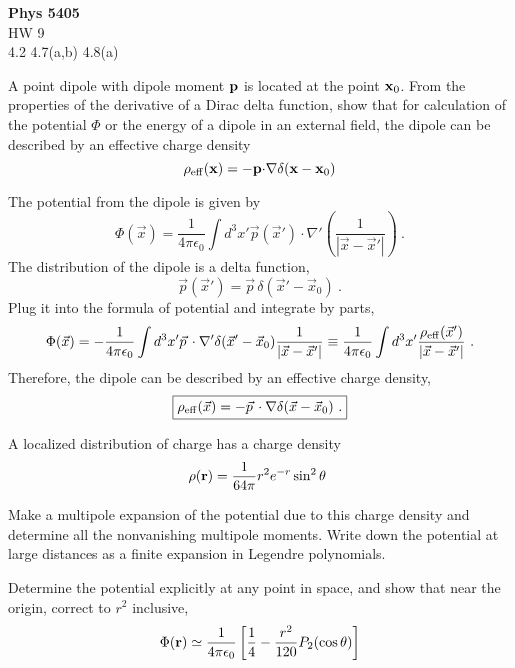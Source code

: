 \documentclass[12pt]{article}
\newcommand{\x}{{\bf x}}
\newcommand{\p}{{\bf p}}
\begin{document}
\begin{center}
{\bf Phys 5405}\\
HW 9 \\
4.2 4.7(a,b) 4.8(a)
\end{center}
 A point dipole with dipole moment $\bf p$ is located at the point ${\bf x}_0$. From the properties of the derivative of a Dirac delta function, show that for calculation of the potential $\Phi$ or the energy of a dipole in an external field, the dipole can be described by an effective charge density
$$
\rho_{\rm eff}(\x) = - \p {\bf \cdot \nabla} \delta(\x - \x_0)
$$

\newpage
{}
The potential from the dipole is given by
\begin{equation}
    \Phi(\vec x) = \frac{1}{4\pi \epsilon_0} \int d^3 x' \vec p(\vec x') \cdot \nabla'\left(\frac{1}{|\vec x - \vec x'|}\right)~.
\end{equation}
The distribution of the dipole is a delta function,
\begin{equation}
    \vec p(\vec x') = \vec p \, \delta(\vec x' - \vec x_0)~.
\end{equation}
Plug it into the formula of potential and integrate by parts,
\begin{equation}
    \Phi(\vec x) = -\frac{1}{4\pi \epsilon_0} \int d^3 x' \vec p \,\cdot \nabla' \delta(\vec x' - \vec x_0) \frac{1}{|\vec x - \vec x'|} \equiv \frac{1}{4\pi \epsilon_0} \int d^3x' \frac{\rho_{\rm eff}(\vec x')}{|\vec x - \vec x'|}~.
\end{equation}
Therefore, the dipole can be described by an effective charge density,
\begin{equation}
    \boxed{
    \rho_{\rm eff}(\vec x) = - \vec p\, \cdot \nabla \delta(\vec x - \vec x_0)~.
    }
\end{equation}

\newpage
{} A localized distribution of charge has a charge density
$$
\rho({\bf r}) = \frac{1}{64 \pi} r^2 e^{-r} \sin^2\theta~
$$

 Make a multipole expansion of the potential due to this charge density and determine all the nonvanishing multipole moments. Write down the potential at large distances as a finite expansion in Legendre polynomials.

 Determine the potential explicitly at any point in space, and show that near the origin, correct to $r^2$ inclusive,
$$
\Phi({\bf r}) \simeq \frac{1}{4\pi \epsilon_0} \left[\frac{1}{4} - \frac{r^2}{120} P_2(\cos\theta)\right]
$$
\end{document}
